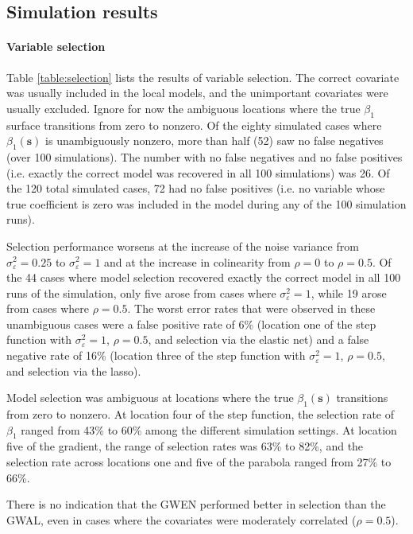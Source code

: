 \documentclass[authoryear, review, 11pt]{elsarticle}
\begin{document}
	\subsection{Simulation results}	
	\paragraph{Variable selection} Table \ref{table:selection} lists the results of variable selection. The correct covariate was usually included in the local models, and the unimportant covariates were usually excluded. Ignore for now the ambiguous locations where the true $\beta_1$ surface transitions from zero to nonzero. Of the eighty simulated cases where $\beta_1(\bm{s})$ is unambiguously nonzero, more than half (52) saw no false negatives (over 100 simulations). The number with no false negatives and no false positives (i.e. exactly the correct model was recovered in all 100 simulations) was 26. Of the 120 total simulated cases, 72 had no false positives (i.e. no variable whose true coefficient is zero was included in the model during any of the 100 simulation runs). 
	
	Selection performance worsens at the increase of the noise variance from $\sigma^2_{\varepsilon}=0.25$ to $\sigma^2_{\varepsilon}=1$ and at the increase in colinearity from $\rho = 0$ to $\rho = 0.5$. Of the 44 cases where model selection recovered exactly the correct model in all 100 runs of the simulation, only five arose from cases where $\sigma^2_{\varepsilon}=1$, while 19 arose from cases where $\rho = 0.5$. The worst error rates that were observed in these unambiguous cases were a false positive rate of 6\% (location one of the step function with $\sigma^2_{\varepsilon}=1$, $\rho=0.5$, and selection via the elastic net) and a false negative rate of 16\% (location three of the step function with $\sigma^2_{\varepsilon}=1$, $\rho=0.5$, and selection via the lasso).
			
	Model selection was ambiguous at locations where the true $\beta_1(\bm{s})$ transitions from zero to nonzero. At location four of the step function, the selection rate of $\beta_1$ ranged from 43\% to 60\% among the different simulation settings. At location five of the gradient, the range of selection rates was 63\% to 82\%, and the selection rate across locations one and five of the parabola ranged from 27\% to 66\%. 

	There is no indication that the GWEN performed better in selection than the GWAL, even in cases where the covariates were moderately correlated ($\rho=0.5$).
	
\end{document}
